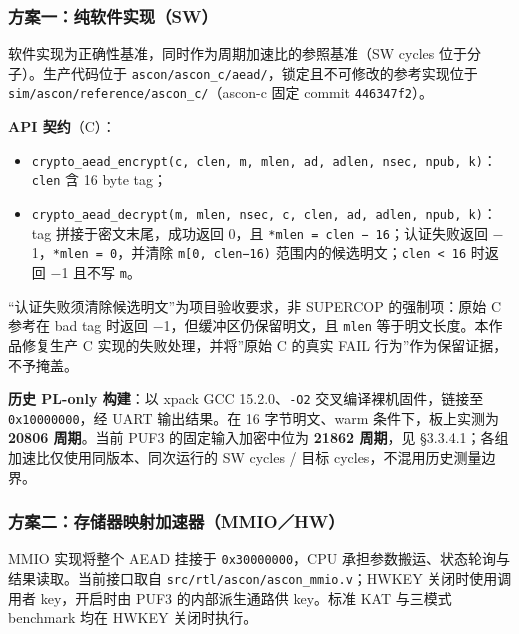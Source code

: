 \Needspace{85pt}

\subsubsection{方案一：纯软件实现（SW）}\label{ux65b9ux6848ux4e00ux7eafux8f6fux4ef6ux5b9eux73b0sw}

软件实现为正确性基准，同时作为周期加速比的参照基准（SW cycles 位于分子）。生产代码位于 \texttt{ascon/\allowbreak{}ascon\_\allowbreak{}c/\allowbreak{}aead/\allowbreak{}}，锁定且不可修改的参考实现位于 \texttt{sim/\allowbreak{}ascon/\allowbreak{}reference/\allowbreak{}ascon\_\allowbreak{}c/\allowbreak{}}（ascon-c 固定 commit \texttt{446347f2}）。

\textbf{API 契约}（C）：

\begin{itemize}
\tightlist
\item
  \texttt{crypto\_\allowbreak{}aead\_\allowbreak{}encrypt(c,\ clen,\ m,\ mlen,\ ad,\ adlen,\ nsec,\ npub,\ k)}：\texttt{clen} 含 16 byte tag；
\item
  \texttt{crypto\_\allowbreak{}aead\_\allowbreak{}decrypt(m,\ mlen,\ nsec,\ c,\ clen,\ ad,\ adlen,\ npub,\ k)}：tag 拼接于密文末尾，成功返回 0，且 \texttt{*mlen\ =\ clen\ −\ 16}；认证失败返回 $-$1，\texttt{*mlen\ =\ 0}，并清除 \texttt{m{[}0,\ clen−16)} 范围内的候选明文；\texttt{clen\ \textless{}\ 16} 时返回 $-$1 且不写 \texttt{m}。
\end{itemize}

``认证失败须清除候选明文''为项目验收要求，非 SUPERCOP 的强制项：原始 C 参考在 bad tag 时返回 $-$1，但缓冲区仍保留明文，且 \texttt{mlen} 等于明文长度。本作品修复生产 C 实现的失败处理，并将''原始 C 的真实 FAIL 行为''作为保留证据，不予掩盖。

\textbf{历史 PL-only 构建}：以 xpack GCC 15.2.0、\texttt{-O2} 交叉编译裸机固件，链接至 \texttt{0x10000000}，经 UART 输出结果。在 16 字节明文、warm 条件下，板上实测为 \textbf{20806 周期}。当前 PUF3 的固定输入加密中位为 \textbf{21862 周期}，见 §3.3.4.1；各组加速比仅使用同版本、同次运行的 SW cycles / 目标 cycles，不混用历史测量边界。

\Needspace{85pt}

\subsubsection{方案二：存储器映射加速器（MMIO／HW）}\label{ux65b9ux6848ux4e8cux5b58ux50a8ux5668ux6620ux5c04ux52a0ux901fux5668mmiohw}

MMIO 实现将整个 AEAD 挂接于 \texttt{0x30000000}，CPU 承担参数搬运、状态轮询与结果读取。当前接口取自 \texttt{src/rtl/ascon/ascon\_mmio.v}；HWKEY 关闭时使用调用者 key，开启时由 PUF3 的内部派生通路供 key。标准 KAT 与三模式 benchmark 均在 HWKEY 关闭时执行。

